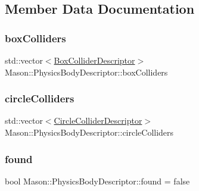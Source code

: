 \subsection{Member Data Documentation}
\hypertarget{class_mason_1_1_physics_body_descriptor_a5bf7d827bc6c3008e60d7eb596ff8f0b}{}\label{class_mason_1_1_physics_body_descriptor_a5bf7d827bc6c3008e60d7eb596ff8f0b} 
\subsubsection{\texorpdfstring{box\+Colliders}{boxColliders}}
{\footnotesize\ttfamily std\+::vector$<$\hyperlink{class_mason_1_1_box_collider_descriptor}{Box\+Collider\+Descriptor}$>$ Mason\+::\+Physics\+Body\+Descriptor\+::box\+Colliders}

\hypertarget{class_mason_1_1_physics_body_descriptor_ade73d134aefec863d829a2bc09712b84}{}\label{class_mason_1_1_physics_body_descriptor_ade73d134aefec863d829a2bc09712b84} 
\subsubsection{\texorpdfstring{circle\+Colliders}{circleColliders}}
{\footnotesize\ttfamily std\+::vector$<$\hyperlink{class_mason_1_1_circle_collider_descriptor}{Circle\+Collider\+Descriptor}$>$ Mason\+::\+Physics\+Body\+Descriptor\+::circle\+Colliders}

\hypertarget{class_mason_1_1_physics_body_descriptor_aa2f258b6d07e44ce6bf4ccbea346f81d}{}\label{class_mason_1_1_physics_body_descriptor_aa2f258b6d07e44ce6bf4ccbea346f81d} 
\subsubsection{\texorpdfstring{found}{found}}
{\footnotesize\ttfamily bool Mason\+::\+Physics\+Body\+Descriptor\+::found = false}

